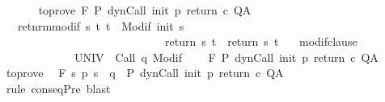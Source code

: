 \begin{isabellebody}
\ \ \ %
\isanewline
\ \ \ to{\isacharunderscore}prove{\isacharcolon}\ {\isachardoublequoteopen}{\isasymGamma}{\isacharcomma}{\isasymTheta}{\isasymturnstile}\isactrlbsub {\isacharslash}F\isactrlesub \ P{\isacharprime}\ {\isacharparenleft}dynCall\ init\ p\ return{\isacharprime}\ c{\isacharparenright}\ Q{\isacharcomma}A{\isachardoublequoteclose}\isanewline
\ \ \ ret{\isacharunderscore}nrm{\isacharunderscore}modif{\isacharcolon}\ {\isachardoublequoteopen}{\isasymforall}s\ t{\isachardot}\ t\ {\isasymin}\ {\isacharparenleft}Modif\ {\isacharparenleft}init\ s{\isacharparenright}{\isacharparenright}\ \isanewline
\ \ \ \ \ \ \ \ \ \ \ \ \ \ \ \ \ \ \ \ \ \ \ \ \ \ \ \ {\isasymlongrightarrow}\ return{\isacharprime}\ s\ t\ {\isacharequal}\ return\ s\ t{\isachardoublequoteclose}\isanewline
\ \ \ modif{\isacharunderscore}clause{\isacharcolon}\ \isanewline
\ \ \ \ \ \ \ \ \ \ \ \ {\isachardoublequoteopen}{\isasymforall}{\isasymsigma}{\isachardot}\ {\isasymGamma}{\isacharcomma}{\isasymTheta}{\isasymturnstile}\isactrlbsub {\isacharslash}UNIV\isactrlesub \ {\isacharbraceleft}{\isasymsigma}{\isacharbraceright}\ {\isacharparenleft}Call\ q{\isacharparenright}\ {\isacharparenleft}Modif\ {\isasymsigma}{\isacharparenright}{\isacharcomma}{\isacharbraceleft}{\isacharbraceright}{\isachardoublequoteclose}\isanewline
\ \ \ {\isachardoublequoteopen}{\isasymGamma}{\isacharcomma}{\isasymTheta}{\isasymturnstile}\isactrlbsub {\isacharslash}F\isactrlesub \ P\ {\isacharparenleft}dynCall\ init\ p\ return\ c{\isacharparenright}\ Q{\isacharcomma}A{\isachardoublequoteclose}\isanewline
%
\isadelimproof
%
\endisadelimproof
%
\isatagproof
{}\isamarkupfalse%
\ {\isacharminus}\isanewline
\ \ \isamarkupfalse%
\ to{\isacharunderscore}prove\ \isamarkupfalse%
\ {\isachardoublequoteopen}{\isasymGamma}{\isacharcomma}{\isasymTheta}{\isasymturnstile}\isactrlbsub {\isacharslash}F\isactrlesub \ {\isacharparenleft}{\isacharbraceleft}s{\isachardot}\ p\ s\ {\isacharequal}\ q{\isacharbraceright}\ {\isasyminter}\ P{\isacharprime}{\isacharparenright}\ {\isacharparenleft}dynCall\ init\ p\ return{\isacharprime}\ c{\isacharparenright}\ Q{\isacharcomma}A{\isachardoublequoteclose}\isanewline
\ \ \ \ \isamarkupfalse%
\ {\isacharparenleft}rule\ conseqPre{\isacharparenright}\ blast\isanewline
\ \ \isamarkupfalse%

\end{isabellebody}
